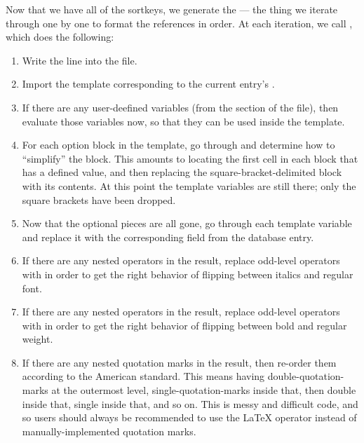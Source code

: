 \documentclass[letterpaper,10pt,english]{sphinxmanual}
\begin{document}
Now that we have all of the sortkeys, we generate the  — the thing we iterate through one by one to format the references in order. At each iteration, we call , which does the following:
\begin{enumerate}
\item {} 
Write the line  into the  file.

\item {} 
Import the template corresponding to the current entry’s .

\item {} 
If there are any user-deefined variables (from the  section of the file), then evaluate those variables now, so that they can be used inside the template.

\item {} 
For each option block in the template, go through and determine how to “simplify” the block. This amounts to locating the first cell in each block that has a defined value, and then replacing the \sphinxcode{\sphinxupquote{{[}...{]}}} square-bracket-delimited block with its contents. At this point the template variables are still there; only the square brackets have been dropped.

\item {} 
Now that the optional pieces are all gone, go through each template variable and replace it with the corresponding field from the database entry.

\item {} 
If there are any nested  operators in the result, replace odd-level operators with  in order to get the right behavior of flipping between italics and regular font.

\item {} 
If there are any nested  operators in the result, replace odd-level operators with  in order to get the right behavior of flipping between bold and regular weight.

\item {} 
If there are any nested quotation marks in the result, then re-order them according to the American standard. This means having double-quotation-marks at the outermost level, single-quotation-marks inside that, then double inside that, single inside that, and so on. This is messy and difficult code, and so users should always be recommended to use the  LaTeX operator instead of manually-implemented quotation marks.

\end{enumerate}
\end{document}
